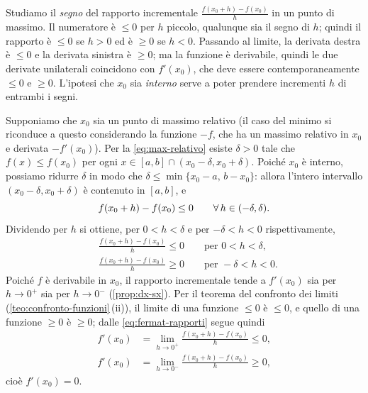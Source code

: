 \begin{schema}
\end{schema}

\begin{strategia}
Studiamo il \emph{segno} del rapporto incrementale $\frac{f(x_{0}+h)-f(x_{0})}{h}$ in un
punto di massimo. Il numeratore è $\le0$ per $h$ piccolo, qualunque sia il segno di $h$;
quindi il rapporto è $\le0$ se $h>0$ ed è $\ge0$ se $h<0$. Passando al limite, la
derivata destra è $\le0$ e la derivata sinistra è $\ge0$; ma la funzione è derivabile,
quindi le due derivate unilaterali coincidono con $f'(x_{0})$, che deve essere
contemporaneamente $\le0$ e $\ge0$. L'ipotesi che $x_{0}$ sia \emph{interno} serve a
poter prendere incrementi $h$ di entrambi i segni.
\end{strategia}

\begin{dimostrazione}
Supponiamo che $x_{0}$ sia un punto di massimo relativo (il caso del minimo si
riconduce a questo considerando la funzione $-f$, che ha un massimo relativo in $x_{0}$ e
derivata $-f'(x_{0})$). Per la \eqref{eq:max-relativo} esiste $\delta>0$ tale che
$f(x)\le f(x_{0})$ per ogni $x\in[a,b]\cap(x_{0}-\delta,x_{0}+\delta)$. Poiché $x_{0}$ è
interno, possiamo ridurre $\delta$ in modo che $\delta\le\min\{x_{0}-a,\,b-x_{0}\}$:
allora l'intero intervallo $(x_{0}-\delta,x_{0}+\delta)$ è contenuto in $[a,b]$, e
\begin{equation}\label{eq:fermat-numeratore}
  f(x_{0}+h)-f(x_{0})\le0 \qquad\forall\, h\in(-\delta,\delta).
\end{equation}
Dividendo per $h$ si ottiene, per $0<h<\delta$ e per $-\delta<h<0$ rispettivamente,
\begin{equation}\label{eq:fermat-rapporti}
\begin{aligned}
  &\frac{f(x_{0}+h)-f(x_{0})}{h}\le0 \qquad\text{per } 0<h<\delta,\\[2pt]
  &\frac{f(x_{0}+h)-f(x_{0})}{h}\ge0 \qquad\text{per } -\delta<h<0.
\end{aligned}
\end{equation}
Poiché $f$ è derivabile in $x_{0}$, il rapporto incrementale tende a $f'(x_{0})$ sia per
$h\to0^{+}$ sia per $h\to0^{-}$ (\cref{prop:dx-sx}). Per il teorema del confronto dei
limiti (\cref{teo:confronto-funzioni}\,(ii)), il limite di una funzione $\le0$ è $\le0$,
e quello di una funzione $\ge0$ è $\ge0$; dalle \eqref{eq:fermat-rapporti} segue quindi
\begin{align*}
  f'(x_{0})&=\lim_{h\to0^{+}}\frac{f(x_{0}+h)-f(x_{0})}{h}\le0,\\
  f'(x_{0})&=\lim_{h\to0^{-}}\frac{f(x_{0}+h)-f(x_{0})}{h}\ge0 ,
\end{align*}
cioè $f'(x_{0})=0$.
\end{dimostrazione}

